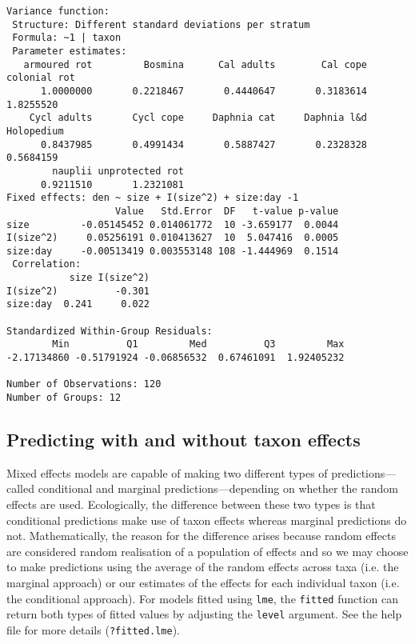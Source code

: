 \documentclass[12pt]{ecologyFORAPPENDIX}
\begin{document}
\begin{verbatim}
Variance function:
 Structure: Different standard deviations per stratum
 Formula: ~1 | taxon 
 Parameter estimates:
   armoured rot         Bosmina      Cal adults        Cal cope    colonial rot 
      1.0000000       0.2218467       0.4440647       0.3183614       1.8255520 
    Cycl adults       Cycl cope     Daphnia cat     Daphnia l&d      Holopedium 
      0.8437985       0.4991434       0.5887427       0.2328328       0.5684159 
        nauplii unprotected rot 
      0.9211510       1.2321081 
Fixed effects: den ~ size + I(size^2) + size:day -1 
                   Value   Std.Error  DF   t-value p-value
size         -0.05145452 0.014061772  10 -3.659177  0.0044
I(size^2)     0.05256191 0.010413627  10  5.047416  0.0005
size:day     -0.00513419 0.003553148 108 -1.444969  0.1514
 Correlation: 
           size I(size^2)
I(size^2)          -0.301       
size:day  0.241     0.022

Standardized Within-Group Residuals:
        Min          Q1         Med          Q3         Max 
-2.17134860 -0.51791924 -0.06856532  0.67461091  1.92405232 

Number of Observations: 120
Number of Groups: 12 
\end{verbatim}
\doublespace
















\subsection{Predicting with and without taxon effects}

Mixed effects models are capable of making two different types of predictions---called conditional and marginal predictions---depending on whether the random effects are used.  Ecologically, the difference between these two types is that conditional predictions make use of taxon effects whereas marginal predictions do not.  Mathematically, the reason for the difference arises because random effects are considered random realisation of a population of effects and so we may choose to make predictions using the average of the random effects across taxa (i.e. the marginal approach) or our estimates of the effects for each individual taxon (i.e. the conditional approach).  For models fitted using \texttt{lme}, the \texttt{fitted} function can return both types of fitted values by adjusting the \texttt{level} argument.  See the help file for more details (\texttt{?fitted.lme}).
\end{document}
